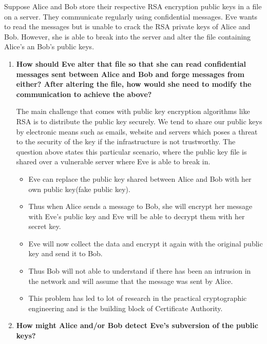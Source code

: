 \documentclass{article}
\begin{document}
Suppose Alice and Bob store their respective RSA encryption public keys in a file on a server.
They communicate regularly using confidential messages. Eve wants to read the messages
but is unable to crack the RSA private keys of Alice and Bob. However, she is able to break into the server and alter the file containing Alice’s an Bob’s public keys.
\begin{enumerate}[label=\alph*]
\item \textbf{How should Eve alter that file so that she can read confidential messages sent between Alice and Bob and forge messages from either? After altering the file, how would she need to modify the communication to achieve the above?}

The main challenge that comes with public key encryption algorithms like RSA is to distribute the public key securely. We tend to share our public keys by electronic means such as emails, website and servers which poses a threat to the security of the key if the infrastructure is not trustworthy.\newline
The question above states this particular scenario, where the public key file is shared over a vulnerable server where Eve is able to break in. 
\begin{itemize}

\item Eve can replace the public key shared between Alice and Bob with her own public key(fake public key).

\item Thus when Alice sends a message to Bob, she will encrypt her message with Eve's public key and Eve will be able to decrypt them with her secret key.

\item Eve will now collect the data and encrypt it again with the original public key and send it to Bob.

\item Thus Bob will not able to understand if there has been an intrusion in the network and will assume that the message was sent by Alice.

\item This problem has led to lot of research in the practical cryptographic engineering and is the building block of Certificate Authority.

\end{itemize}

\item \textbf{How might Alice and/or Bob detect Eve’s subversion of the public keys?}


\end{enumerate}
\end{document}
